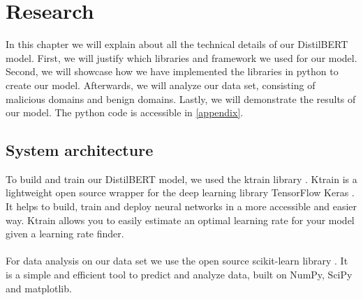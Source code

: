 \chapter{Research}\label{research}

In this chapter we will explain about all the technical details of our DistilBERT model. First, we will justify which libraries and framework we used for our model. Second, we will showcase how we have implemented the libraries in python to create our model. Afterwards, we will analyze our data set, consisting of malicious domains and benign domains. Lastly, we will demonstrate the results of our model. The python code is accessible in \ref{appendix}.

\section{System architecture}
To build and train our DistilBERT model, we used the ktrain library \cite{maiya2020ktrain}. Ktrain is a lightweight open source wrapper for the deep learning library TensorFlow Keras \cite{chollet2015keras}. It helps to build, train and deploy neural networks in a more accessible and easier way. Ktrain allows you to easily estimate an optimal learning rate for your model given a learning rate finder.\\\\
For data analysis on our data set we use the open source scikit-learn library \cite{sklearn_api}. It is a simple and efficient tool to predict and analyze data, built on NumPy, SciPy and matplotlib.

